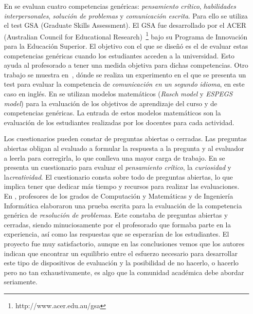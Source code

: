 En \cite{badcock2010developing} se evaluan cuatro competencias genéricas: \emph{pensamiento crítico}, \emph{habilidades interpersonales}, \emph{solución de problemas} y \emph{comunicación escrita}. Para ello se utiliza el test GSA (Graduate Skills Assessment). El GSA fue desarrollado por el ACER (Australian Council for Educational Research)~\footnote{http://www.acer.edu.au/gsa}  bajo su Programa de Innovación para la Educación Superior. El objetivo con el que se diseñó es el de evaluar estas competencias genéricas cuando los estudiantes acceden a la universidad. Esto ayuda al profesorado a tener una medida objetiva para dichas competencias. Otro trabajo se muestra en~\cite{fernandez2011experience}, dónde se realiza un experimento en el que se presenta un test para evaluar la competencia de \emph{comunicación en un segundo idioma}, en este caso en inglés. En \cite{aziz2007appraisal,rashid2008engineering,a2007outcome} se utilizan modelos matemáticos (\emph{Rasch model} y \emph{ESPEGS model}) para la evaluación de los objetivos de aprendizaje del curso y de competencias genéricas. La entrada de estos modelos matemáticos son la evaluación de los estudiantes realizadas por los docentes para cada actividad. 

Los cuestionarios pueden constar de preguntas abiertas o cerradas. Las preguntas abiertas obligan al evaluado a formular la respuesta a la pregunta y al evaluador a leerla para corregirla, lo que conlleva una mayor carga de trabajo. En \cite{albergaria2011critical} se presenta un cuestionario para evaluar el \emph{pensamiento crítico}, la \emph{curiosidad} y la\emph{creatividad}. El cuestionario consta sobre todo de preguntas abiertas, lo que implica tener que dedicar más tiempo y recursos para realizar las evaluaciones. En \cite{vizcarro2013assessment}, profesores de los grados de Computación y Matemáticas y de Ingeniería Informática elaboraron una prueba escrita para la evaluación de la competencia genérica de \emph{resolución de problemas}. Este constaba de preguntas abiertas y cerradas, siendo minuciosamente por el profesorado que formaba parte en la experiencia, así como las respuestas que se esperarían de los estudiantes. El proyecto fue muy satisfactorio, aunque en las conclusiones vemos que los autores indican que encontrar un equilibrio entre el esfuerzo necesario para desarrollar este tipo de dispositivos de evaluación y la posibilidad de no hacerlo, o hacerlo pero no tan exhaustivamente, es algo que la comunidad académica debe abordar seriamente.




